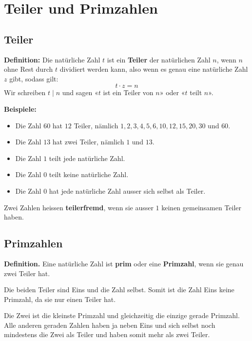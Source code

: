 \newpage
\section{Teiler und Primzahlen}

\subsection{Teiler}

\textbf{Definition:} Die natürliche Zahl $t$ ist ein \textbf{Teiler} der natürlichen Zahl $n$, wenn $n$ ohne Rest durch $t$ dividiert werden kann, also wenn es genau eine natürliche Zahl $z$ gibt, sodass gilt:
  \[
    t\cdot z = n
  \]
Wir schreiben $t\mid n$ und sagen «$t$ ist ein Teiler von $n$» oder «$t$ teilt $n$».

\begin{example}
  \textbf{Beispiele:}
  \begin{itemize}[noitemsep]
    \item Die Zahl $60$ hat $12$ Teiler, nämlich $1, 2, 3, 4, 5, 6, 10, 12, 15, 20, 30$ und $60$.
    \item Die Zahl $13$ hat zwei Teiler, nämlich $1$ und $13$.
    \item Die Zahl $1$ teilt jede natürliche Zahl.
    \item Die Zahl $0$ teilt keine natürliche Zahl.
    \item Die Zahl $0$ hat jede natürliche Zahl ausser sich selbst als Teiler.
  \end{itemize}
\end{example}

Zwei Zahlen heissen \textbf{teilerfremd}, wenn sie ausser $1$ keinen gemeinsamen Teiler haben.

\subsection{Primzahlen}

\textbf{Definition.} Eine natürliche Zahl ist \textbf{prim} oder eine \textbf{Primzahl}, wenn sie genau zwei Teiler hat.

Die beiden Teiler sind Eins und die Zahl selbst. Somit ist die Zahl Eins keine Primzahl, da sie nur einen Teiler hat.

Die Zwei ist die kleinste Primzahl und gleichzeitig die einzige gerade Primzahl. Alle anderen geraden Zahlen haben ja neben Eins und sich selbst noch mindestens die Zwei als Teiler und haben somit mehr als zwei Teiler.

